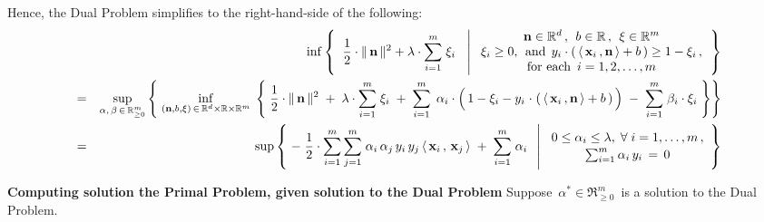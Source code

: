 Hence, the Dual Problem simplifies to the right-hand-side of the following:
\begin{eqnarray*}
&&
	\inf
	\left\{\;\;
		\dfrac{1}{2}\cdot\Vert\,\mathbf{n}\,\Vert^{2}
		+
		\lambda\cdot\overset{m}{\underset{i=1}{\sum}}\;\xi_{i}
		\;\;\,\left\vert\;
		\begin{array}{c}
			\mathbf{n} \in \Re^{d} \,,\;\, b \in \Re \,,\;\, \xi \in \Re^{m}
			\\
			\xi_{i} \geq 0,\;\,\textnormal{and}\;\,
			y_{i}\cdot\left(\,\langle\,\mathbf{x}_{i}\,,\mathbf{n}\,\rangle + b\,\right) \geq 1 - \xi_{i}\,,
			\\
			\textnormal{for each \,$i = 1,2,\ldots,m$}
			\end{array}
			\right.
		\right\}
\\
& = &
	\underset{\alpha,\,\beta\,\in\,\Re_{\geq 0}^{m}}{\sup}
	\left\{\;
		\underset{(\mathbf{n},b,\xi)\,\in\,\Re^{d}\times\Re\times\Re^{m}}{\inf}\;
		\left\{\;
			\dfrac{1}{2}\cdot\Vert\,\mathbf{n}\,\Vert^{2}
			\; + \;
			\lambda\cdot\overset{m}{\underset{i=1}{\sum}}\;\xi_{i}
			\; + \;
			\overset{m}{\underset{i = 1}{\sum}}\;\,
				\alpha_{i}
				\cdot
				\left(\,
					1 - \xi_{i}
					-
					y_{i}\overset{{\color{white}1}}{\cdot}\left(\,
						\langle\,\mathbf{x}_{i}\,,\mathbf{n}\,\rangle + b
						\,\right)
					\,\right)
			\; - \;
			\overset{m}{\underset{i = 1}{\sum}}\;
				\beta_{i}
				\cdot
				\xi_{i}
			\;\right\}
		\right\}
\\
& = &
	\sup
	\left\{\,
	\left.
		-\;\dfrac{1}{2}\cdot
		\overset{m}{\underset{i=1}{\sum}}\,
		\overset{m}{\underset{j=1}{\sum}}\;
		\alpha_{i}\,\alpha_{j}\,y_{i}\,y_{j}\,\langle\,\mathbf{x}_{i}\,,\,\mathbf{x}_{j}\,\rangle
		\; + \;
		\overset{m}{\underset{i = 1}{\sum}}\;\alpha_{i}
	\;\;\,\right\vert\,
		\begin{array}{c}
			0 \leq \alpha_{i} \leq \lambda,\;\forall\;i =1,\ldots,m\,,
			\\
			\sum_{i=1}^{m}\alpha_{i}\,y_{i} \,=\, \overset{{\color{white}.}}{0}
		\end{array}
		\right\}
\end{eqnarray*}


\vskip 0.5cm
\noindent
\textbf{Computing solution the Primal Problem, given solution to the Dual Problem}
\vskip 0.1cm
\noindent
Suppose \,$\alpha^{*} \in \Re_{\geq 0}^{m}$\, is a solution to the Dual Problem.

